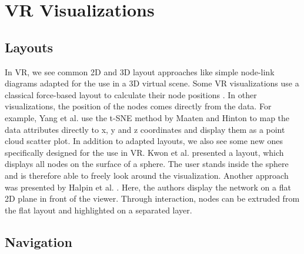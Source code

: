 \section{VR Visualizations}
\label{chap:rw-VRVIS}
\subsection{Layouts}
\label{chap:rw-vrlayouts}
In VR, we see common 2D and 3D layout approaches like simple node-link diagrams adapted for the use in a 3D virtual scene. 
Some VR visualizations use a classical force-based layout to calculate their node positions \cite{drogemuller_examining_2020} \cite{sorger_immersive_2019}.
In other visualizations, the position of the nodes comes directly from the data. For example, Yang et al. \cite{yang_embodied_2020} use the t-SNE method by Maaten and Hinton \cite{maaten_visualizing_2008} to map the data attributes directly to x, y and z coordinates and display them as a point cloud scatter plot.
In addition to adapted layouts, we also see some new ones specifically designed for the use in VR. Kwon et al. \cite{kwon_study_2016} presented a layout, which displays all nodes on the surface of a sphere. The user stands inside the sphere and is therefore able to freely look around the visualization. Another approach was presented by Halpin et al. \cite{halpin_exploring_2008}. Here, the authors display the network on a flat 2D plane in front of the viewer. Through interaction, nodes can be extruded from the flat layout and highlighted on a separated layer.     

\subsection{Navigation}
\label{chap:rw-vrnavigation}

